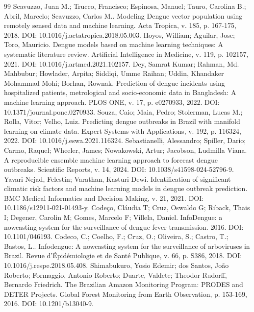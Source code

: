 \documentclass[12pt,a4paper]{article}
\begin{document}
\begin{thebibliography}{99}
 Scavuzzo, Juan M.; Trucco, Francisco; Espinosa, Manuel; Tauro, Carolina B.; Abril, Marcelo; Scavuzzo, Carlos M.. Modeling Dengue vector population using remotely sensed data and machine learning. Acta Tropica, v. 185, p. 167-175, 2018. DOI: 10.1016/j.actatropica.2018.05.003.
 Hoyos, William; Aguilar, Jose; Toro, Mauricio. Dengue models based on machine learning techniques: A systematic literature review. Artificial Intelligence in Medicine, v. 119, p. 102157, 2021. DOI: 10.1016/j.artmed.2021.102157.
 Dey, Samrat Kumar; Rahman, Md. Mahbubur; Howlader, Arpita; Siddiqi, Umme Raihan; Uddin, Khandaker Mohammad Mohi; Borhan, Rownak. Prediction of dengue incidents using hospitalized patients, metrological and socio-economic data in Bangladesh: A machine learning approach. PLOS ONE, v. 17, p. e0270933, 2022. DOI: 10.1371/journal.pone.0270933.
 Souza, Caio; Maia, Pedro; Stolerman, Lucas M.; Rolla, Vitor; Velho, Luiz. Predicting dengue outbreaks in Brazil with manifold learning on climate data. Expert Systems with Applications, v. 192, p. 116324, 2022. DOI: 10.1016/j.eswa.2021.116324.
 Sebastianelli, Alessandro; Spiller, Dario; Carmo, Raquel; Wheeler, James; Nowakowski, Artur; Jacobson, Ludmilla Viana. A reproducible ensemble machine learning approach to forecast dengue outbreaks. Scientific Reports, v. 14, 2024. DOI: 10.1038/s41598-024-52796-9.
 Yavari Nejad, Felestin; Varathan, Kasturi Dewi. Identification of significant climatic risk factors and machine learning models in dengue outbreak prediction. BMC Medical Informatics and Decision Making, v. 21, 2021. DOI: 10.1186/s12911-021-01493-y.
 Codeço, Cláudia T; Cruz, Oswaldo G; Riback, Thais I; Degener, Carolin M; Gomes, Marcelo F; Villela, Daniel. InfoDengue: a nowcasting system for the surveillance of dengue fever transmission. 2016. DOI: 10.1101/046193.
 Codeco, C.; Coelho, F.; Cruz, O.; Oliveira, S.; Castro, T.; Bastos, L.. Infodengue: A nowcasting system for the surveillance of arboviruses in Brazil. Revue d'Épidémiologie et de Santé Publique, v. 66, p. S386, 2018. DOI: 10.1016/j.respe.2018.05.408.
 Shimabukuro, Yosio Edemir; dos Santos, João Roberto; Formaggio, Antonio Roberto; Duarte, Valdete; Theodor Rudorff, Bernardo Friedrich. The Brazilian Amazon Monitoring Program: PRODES and DETER Projects. Global Forest Monitoring from Earth Observation, p. 153-169, 2016. DOI: 10.1201/b13040-9.

\end{thebibliography}
\end{document}
